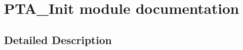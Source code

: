 \hypertarget{group___p_t_a___init__module}{}\section{P\+T\+A\+\_\+\+Init module documentation}
\label{group___p_t_a___init__module}


\subsection{Detailed Description}
